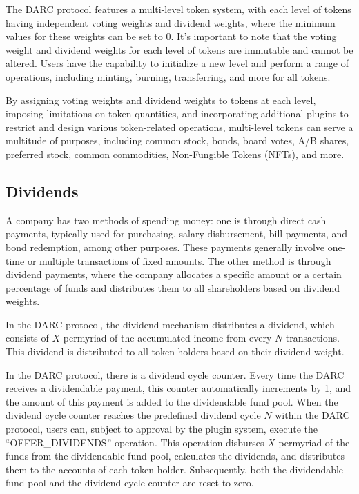 \documentclass[main.tex]{subfiles}
\begin{document}
The DARC protocol features a multi-level token system, with each level of tokens having independent voting weights and dividend weights, where the minimum values for these weights can be set to 0. It's important to note that the voting weight and dividend weights for each level of tokens are immutable and cannot be altered. Users have the capability to initialize a new level and perform a range of operations, including minting, burning, transferring, and more for all tokens.

By assigning voting weights and dividend weights to tokens at each level, imposing limitations on token quantities, and incorporating additional plugins to restrict and design various token-related operations, multi-level tokens can serve a multitude of purposes, including common stock, bonds, board votes, A/B shares, preferred stock, common commodities, Non-Fungible Tokens (NFTs), and more.

\subsection{Dividends}

A company has two methods of spending money: one is through direct cash payments, typically used for purchasing, salary disbursement, bill payments, and bond redemption, among other purposes. These payments generally involve one-time or multiple transactions of fixed amounts. The other method is through dividend payments, where the company allocates a specific amount or a certain percentage of funds and distributes them to all shareholders based on dividend weights.

In the DARC protocol, the dividend mechanism distributes a dividend, which consists of $X$ permyriad of the accumulated income from every $N$ transactions. This dividend is distributed to all token holders based on their dividend weight. 

In the DARC protocol, there is a dividend cycle counter. Every time the DARC receives a dividendable payment, this counter automatically increments by 1, and the amount of this payment is added to the dividendable fund pool. When the dividend cycle counter reaches the predefined dividend cycle $N$ within the DARC protocol, users can, subject to approval by the plugin system, execute the ``OFFER\_DIVIDENDS'' operation. This operation disburses $X$ permyriad of the funds from the dividendable fund pool, calculates the dividends, and distributes them to the accounts of each token holder. Subsequently, both the dividendable fund pool and the dividend cycle counter are reset to zero.
\end{document}
